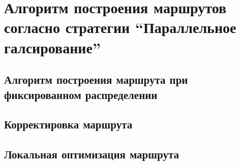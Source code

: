 \chapter{Алгоритм построения маршрутов согласно стратегии
``Параллельное галсирование''}
\section{Алгоритм построения маршрута при
 фиксированном распределении}
\FloatBarrier
\section{Корректировка маршрута}
\FloatBarrier
\section{Локальная оптимизация маршрута}
\FloatBarrier
